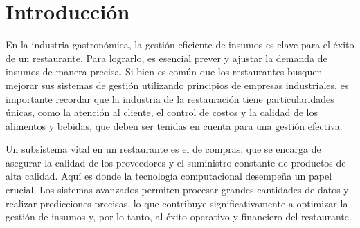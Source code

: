 \fancyhead{}
\fancyfoot{}
\cfoot{\thepage}

\chapter{Introducción}

En la industria gastronómica, la gestión eficiente de insumos es clave para el éxito de un restaurante. Para lograrlo, es esencial prever y ajustar la demanda de insumos de manera precisa. Si bien es común que los restaurantes busquen mejorar sus sistemas de gestión utilizando principios de empresas industriales, es importante recordar que la industria de la restauración tiene particularidades únicas, como la atención al cliente, el control de costos y la calidad de los alimentos y bebidas, que deben ser tenidas en cuenta para una gestión efectiva.

Un subsistema vital en un restaurante es el de compras, que se encarga de asegurar la calidad de los proveedores y el suministro constante de productos de alta calidad. Aquí es donde la tecnología computacional desempeña un papel crucial. Los sistemas avanzados permiten procesar grandes cantidades de datos y realizar predicciones precisas, lo que contribuye significativamente a optimizar la gestión de insumos y, por lo tanto, al éxito operativo y financiero del restaurante.




